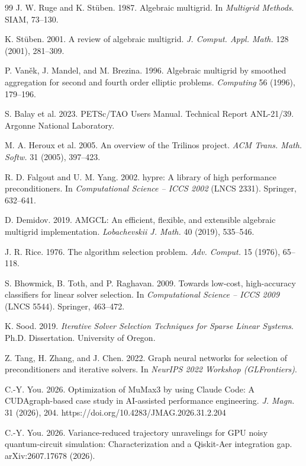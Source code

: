 \documentclass[acmsmall,screen,review]{acmart}
\begin{document}

\begin{thebibliography}{99}
 J. W. Ruge and K. St\"uben. 1987.
Algebraic multigrid. In \emph{Multigrid Methods}. SIAM, 73--130.

 K. St\"uben. 2001.
A review of algebraic multigrid.
\emph{J. Comput. Appl. Math.} 128 (2001), 281--309.

 P. Van\v{e}k, J. Mandel, and M. Brezina. 1996.
Algebraic multigrid by smoothed aggregation for second and fourth order
elliptic problems. \emph{Computing} 56 (1996), 179--196.

 S. Balay et al. 2023.
PETSc/TAO Users Manual. Technical Report ANL-21/39. Argonne National Laboratory.

 M. A. Heroux et al. 2005.
An overview of the Trilinos project.
\emph{ACM Trans. Math. Softw.} 31 (2005), 397--423.

 R. D. Falgout and U. M. Yang. 2002.
hypre: A library of high performance preconditioners. In \emph{Computational
Science -- ICCS 2002} (LNCS 2331). Springer, 632--641.

 D. Demidov. 2019.
AMGCL: An efficient, flexible, and extensible algebraic multigrid
implementation. \emph{Lobachevskii J. Math.} 40 (2019), 535--546.

 J. R. Rice. 1976.
The algorithm selection problem. \emph{Adv. Comput.} 15 (1976), 65--118.

 S. Bhowmick, B. Toth, and P. Raghavan. 2009.
Towards low-cost, high-accuracy classifiers for linear solver selection. In
\emph{Computational Science -- ICCS 2009} (LNCS 5544). Springer, 463--472.

 K. Sood. 2019.
\emph{Iterative Solver Selection Techniques for Sparse Linear Systems}.
Ph.D. Dissertation. University of Oregon.

 Z. Tang, H. Zhang, and J. Chen. 2022.
Graph neural networks for selection of preconditioners and iterative solvers.
In \emph{NeurIPS 2022 Workshop (GLFrontiers)}.

 C.-Y. You. 2026.
Optimization of MuMax3 by using Claude Code: A CUDAgraph-based case study
in AI-assisted performance engineering.
\emph{J. Magn.} 31 (2026), 204.
https://doi.org/10.4283/JMAG.2026.31.2.204

 C.-Y. You. 2026.
Variance-reduced trajectory unravelings for GPU noisy quantum-circuit
simulation: Characterization and a Qiskit-Aer integration gap.
arXiv:2607.17678 (2026).


\end{thebibliography}
\end{document}
